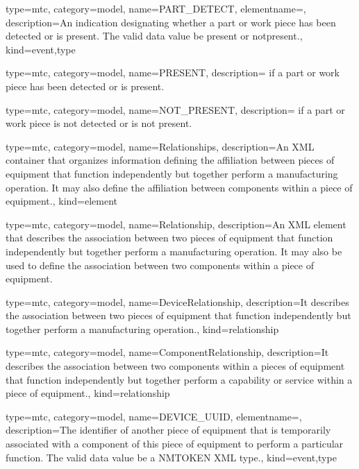 {
  type=mtc,
  category=model,
  name={PART\_DETECT},
  elementname=,
  description={An indication designating whether a part or work piece has been detected or is present.
  \newline The \gls{valid data value} \MUST be \gls{present} or \gls{notpresent}.},
  kind={event,type}
}


{
  type=mtc,
  category=model,
  name={PRESENT},
  description={ if a part or work piece has been detected or is present.}
}


{
  type=mtc,
  category=model,
  name={NOT\_PRESENT},
  description={ if a part or work piece is not detected or is not present.}
}


{
  type=mtc,
  category=model,
  name={Relationships},
  description={An XML container that organizes information defining the affiliation between pieces of equipment that function independently but together perform a manufacturing operation.  It may also define the affiliation between components within a piece of equipment.},
  kind={element}
}

{
  type=mtc,
  category=model,
  name={Relationship},
  description={An XML element that describes the association between two pieces of equipment that function independently but together perform a manufacturing operation. It may also be used to define the association between two components within a piece of equipment.}
}


{
  type=mtc,
  category=model,
  name={DeviceRelationship},
  description={It describes the association between two pieces of equipment that function independently but together perform a manufacturing operation.},
  kind={relationship}
}


{
  type=mtc,
  category=model,
  name={ComponentRelationship},
  description={It describes the association between two components within a pieces of equipment that function independently but together perform a capability or service within a piece of equipment.},
  kind={relationship}
}


{
  type=mtc,
  category=model,
  name={DEVICE\_UUID},
  elementname=,
  description={The identifier of another piece of equipment that is temporarily associated with a component of this piece of equipment to perform a particular function.
  \newline The \gls{valid data value} \MUST be a NMTOKEN XML type.},
  kind={event,type}
}


